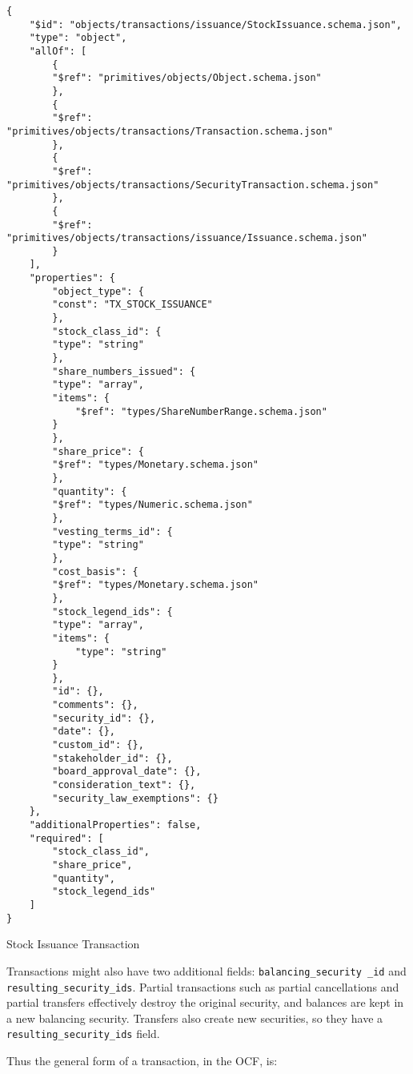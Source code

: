\begin{listing}[!h]
\begin{verbatim}
{
	"$id": "objects/transactions/issuance/StockIssuance.schema.json",
	"type": "object",
	"allOf": [
		{
		"$ref": "primitives/objects/Object.schema.json"
		},
		{
		"$ref": "primitives/objects/transactions/Transaction.schema.json"
		},
		{
		"$ref": "primitives/objects/transactions/SecurityTransaction.schema.json"
		},
		{
		"$ref": "primitives/objects/transactions/issuance/Issuance.schema.json"
		}
	],
	"properties": {
		"object_type": {
		"const": "TX_STOCK_ISSUANCE"
		},
		"stock_class_id": {
		"type": "string"
		},
		"share_numbers_issued": {
		"type": "array",
		"items": {
			"$ref": "types/ShareNumberRange.schema.json"
		}
		},
		"share_price": {
		"$ref": "types/Monetary.schema.json"
		},
		"quantity": {
		"$ref": "types/Numeric.schema.json"
		},
		"vesting_terms_id": {
		"type": "string"
		},
		"cost_basis": {
		"$ref": "types/Monetary.schema.json"
		},
		"stock_legend_ids": {
		"type": "array",
		"items": {
			"type": "string"
		}
		},
		"id": {},
		"comments": {},
		"security_id": {},
		"date": {},
		"custom_id": {},
		"stakeholder_id": {},
		"board_approval_date": {},
		"consideration_text": {},
		"security_law_exemptions": {}
	},
	"additionalProperties": false,
	"required": [
		"stock_class_id",
		"share_price",
		"quantity",
		"stock_legend_ids"
	]
}
\end{verbatim}
\caption{Stock Issuance Transaction}
\label{listing:stockissuance-transaction-json-schema}
\end{listing}




Transactions might also have two additional fields: \verb|balancing_security _id| and \verb|resulting_security_ids|. Partial transactions such as partial cancellations and partial transfers effectively destroy the original security, and balances are kept in a new balancing security. Transfers also create new securities, so they have a \verb|resulting_security_ids| field.


Thus the general form of a transaction, in the OCF, is:


